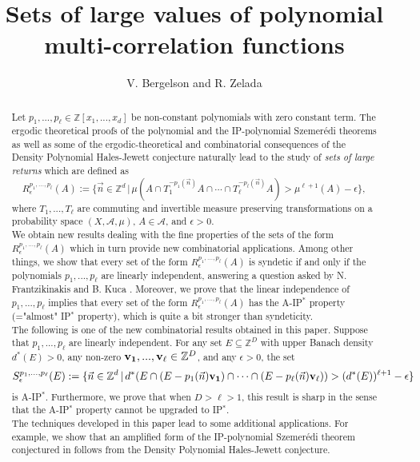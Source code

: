 \documentclass[11pt,american,preprint]{elsarticle}
\title{Sets of large values of polynomial multi-correlation functions}
\numberwithin{equation}{section}
\theoremstyle{plain}
\theoremstyle{plain*}
\theoremstyle{plain}
\theoremstyle{plain*}
\theoremstyle{plain}
\theoremstyle{plain*}
\theoremstyle{remark}
\theoremstyle{remark*}
\theoremstyle{remark}
\theoremstyle{remark*}
\theoremstyle{remark}
\theoremstyle{remark*}
\theoremstyle{plain}
\theoremstyle{definition}
\theoremstyle{plain}
\theoremstyle{plain} %
\newcommand{\Z}{\mathbb{Z}}
\begin{document}
\author{V. Bergelson and R. Zelada}
\begin{abstract}
Let $p_1,...,p_\ell\in\Z[x_1,...,x_d]$ be non-constant polynomials with zero constant term. The ergodic theoretical proofs of the 
polynomial \cite{bergelsonLeibmaPolyVderWardenAndSz} and the IP-polynomial \cite{berMcCuIPPolySzemeredi} Szemer{\'e}di  theorems  as well as some of the ergodic-theoretical and combinatorial consequences of the Density Polynomial Hales-Jewett conjecture \cite{ERTaU} naturally lead to the study of \textit{sets of large returns} which are defined as 
$$
R_\epsilon^{p_1,...,p_\ell}(A):=\{\vec n\in\Z^d\,|\,\mu(A\cap T_1^{-p_1(\vec n)}A\cap\cdots\cap T_\ell^{-p_\ell(\vec n)}A)>\mu^{\ell+1}(A)-\epsilon\},
$$
where $T_1,...,T_\ell$ are commuting and invertible measure preserving transformations  on a probability space $(X,\mathcal A,\mu)$, $A\in \mathcal A$,  and $\epsilon>0$.\\
We obtain new results dealing with the fine properties of the sets of the form $R_\epsilon^{p_1,...,p_\ell}(A)$ which in turn provide new combinatorial applications.
Among other things, we show that 
every set of the form $R_\epsilon^{p_1,...,p_\ell}(A)$ is syndetic if and only if the polynomials $p_1,...,p_\ell$ are linearly independent, answering a question asked by  N. Frantzikinakis and B. Kuca \cite{FraKuJoinErgForIndependentPolys}. 
Moreover, we prove that the linear independence of $p_1,...,p_\ell$ implies that every set of the form $R_\epsilon^{p_1,...,p_\ell}(A)$ has the A-IP$^*$ property (="almost" IP$^*$ property), which is  quite a bit stronger than syndeticity.\\
The following is one of the  new combinatorial results  obtained in this paper. Suppose that $p_1,...,p_\ell$ are linearly independent. For  any set $E\subseteq\Z^D$ with upper Banach density  $d^*(E)>0$, any non-zero ${\bf v_1,..., v_\ell}\in\Z^D$, and any $\epsilon>0$, the set 
\begin{equation*}\label{Abstract:DefnCombinatorialSet}
S_\epsilon^{p_1,...,p_\ell}(E):=\{\vec n\in\Z^d\,|\,d^*(E\cap (E-p_1(\vec n){\bf v_1})\cap \cdots\cap (E-p_\ell(\vec n){\bf v_\ell}))>(d^*(E))^{\ell+1}-\epsilon\}
\end{equation*}
is A-IP$^*$.  Furthermore, we prove that when $D>\ell>1$, this result is sharp in the sense that  the A-IP$^*$ property  cannot be upgraded to  IP$^*$. \\
The techniques developed in this paper lead to some additional applications. For example, we show that an amplified form of the IP-polynomial Szemer{\'e}di theorem conjectured in \cite{berMcCuIPPolySzemeredi} follows from the Density Polynomial Hales-Jewett conjecture.
\end{abstract}
\end{document}
